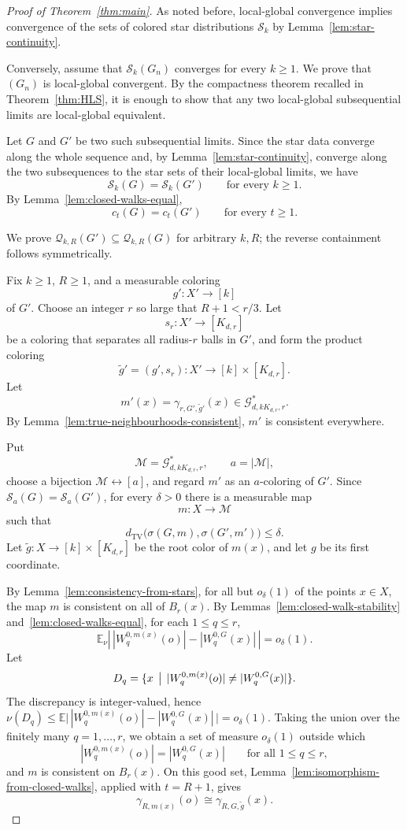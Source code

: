 \documentclass[11pt]{amsart}
\newcommand{\E}{\mathbb E}
\newcommand{\calG}{\mathcal G}
\newcommand{\calQ}{\mathcal Q}
\newcommand{\calS}{\mathcal S}
\newcommand{\TV}{\operatorname{TV}}
\theoremstyle{remark}
\begin{document}
\begin{proof}[Proof of Theorem~\ref{thm:main}]
As noted before, local-global convergence implies convergence of the sets of colored star distributions $\calS_k$ by Lemma~\ref{lem:star-continuity}.

Conversely, assume that $\calS_k(G_n)$ converges for every $k\geq 1$.  We prove that $(G_n)$ is local-global convergent.  By the compactness theorem recalled in Theorem~\ref{thm:HLS}, it is enough to show that any two local-global subsequential limits are local-global equivalent.

Let $G$ and $G'$ be two such subsequential limits.  Since the star data converge along the whole sequence and, by Lemma~\ref{lem:star-continuity}, converge along the two subsequences to the star sets of their local-global limits, we have
\[
 \calS_k(G)=\calS_k(G')
 \qquad\text{for every }k\geq 1.
\]
By Lemma~\ref{lem:closed-walks-equal},
\[
 c_t(G)=c_t(G')
 \qquad\text{for every }t\geq 1.
\]

We prove $\calQ_{k,R}(G')\subseteq\calQ_{k,R}(G)$ for arbitrary $k,R$; the reverse containment follows symmetrically.

Fix $k\geq 1$, $R\geq 1$, and a measurable coloring
\[
 g'\colon X'\to[k]
\]
of $G'$.  Choose an integer $r$ so large that $R+1<r/3$.  Let
\[
 s_r\colon X'\to[K_{d,r}]
\]
be a coloring that separates all radius-$r$ balls in $G'$, and form the product coloring
\[
 \widetilde g'=(g',s_r)\colon X'\to[k]\times[K_{d,r}].
\]
Let
\[
 m'(x)=\gamma_{r,G',\widetilde g'}(x)
 \in\calG^*_{d,kK_{d,r},r}.
\]
By Lemma~\ref{lem:true-neighbourhoods-consistent}, $m'$ is consistent everywhere.

Put
\[
 \mathcal M=\calG^*_{d,kK_{d,r},r},\qquad a=|\mathcal M|,
\]
choose a bijection $\mathcal M\leftrightarrow[a]$, and regard $m'$ as an $a$-coloring of $G'$.  Since $\calS_a(G)=\calS_a(G')$, for every $\delta>0$ there is a measurable map
\[
 m\colon X\to\mathcal M
\]
such that
\[
 d_{\TV}\bigl(\sigma(G,m),\sigma(G',m')\bigr)\leq\delta.
\]
Let $\widetilde g\colon X\to[k]\times[K_{d,r}]$ be the root color of $m(x)$, and let $g$ be its first coordinate.

By Lemma~\ref{lem:consistency-from-stars}, for all but $o_\delta(1)$ of the points $x\in X$, the map $m$ is consistent on all of $B_r(x)$.  By Lemmas~\ref{lem:closed-walk-stability} and~\ref{lem:closed-walks-equal}, for each $1\leq q\leq r$,
\[
 \E_\nu\left|\,|W_q^{0,m(x)}(o)|-|W_q^{0,G}(x)|\,\right|=o_\delta(1).
\]
Let
\[
 D_q=\{x\,\bigm|\, |W_q^{0,m(x)}(o)|\neq |W_q^{0,G}(x)|\}.
\]
The discrepancy is integer-valued, hence $\nu(D_q)\leq \E  \bigl|\,|W_q^{0,m(x)}(o)|-|W_q^{0,G}(x)|\,\bigr|=o_\delta(1)$.  Taking the union over the finitely many $q=1,\ldots,r$, we obtain a set of measure $o_\delta(1)$ outside which
\[
 |W_q^{0,m(x)}(o)|=|W_q^{0,G}(x)|
 \qquad\text{for all }1\leq q\leq r,
\]
and $m$ is consistent on $B_r(x)$.  On this good set, Lemma~\ref{lem:isomorphism-from-closed-walks}, applied with $t=R+1$, gives
\[
 \gamma_{R,m(x)}(o)
 \cong
 \gamma_{R,G,\widetilde g}(x).
\]


\end{proof}
\end{document}
